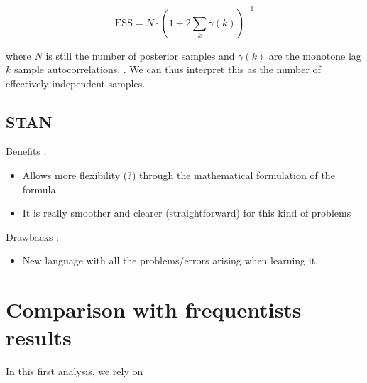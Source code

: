 \begin{equation}
\text{ESS}=N\cdot (1+2\sum_k\gamma(k))^{-1}
\end{equation}

where $N$ is still the number of posterior samples and $\gamma(k)$ are the monotone lag $k$ sample autocorrelations. \citet{geyer__1992}. We can thus interpret this as the number of effectively independent samples. 


\subsection{STAN}

Benefits : 

\begin{itemize}
	\item Allows more flexibility (?) through the mathematical formulation of the formula
	\item It is really smoother and clearer (straightforward) for this kind of problems 
\end{itemize}

Drawbacks : 

\begin{itemize}
	\item New language with all the problems/errors arising when learning it. 
\end{itemize}



\section{Comparison with frequentists results}

In this first analysis, we rely on 
